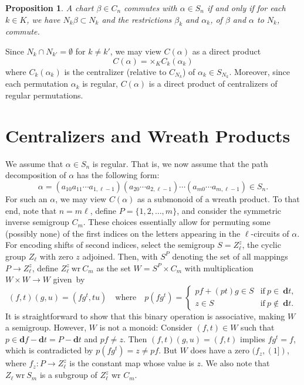 \documentclass{surv-l}
\numberwithin{equation}{section}
\numberwithin{table}{section}
\numberwithin{figure}{section}
\theoremstyle{plain}
\newtheorem{proposition}[equation]{Proposition}
\theoremstyle{definition}
\begin{document}
\begin{proposition}\label{prop4.13.2}
A chart $\beta\in C_{n}$ commutes with $\alpha\in S_{n}$ if and
only if for each $k\in K$, we have $N_{k}\beta\subset N_{k}$ and
the restrictions $\beta_{k}$ and $\alpha_{k}$, of $\beta$  and
$\alpha$ to $N_{k}$, commute.
\end{proposition}

Since $N_{k}\cap N_{k'}=\emptyset$ for $k\neq k'$, we may view
$C(\alpha)$ as a direct product
\[
C(\alpha)=\times {}_{K}C_{k}(\alpha_{k})
\]
where $C_{k}(\alpha_{k})$ is the centralizer (relative to
$C_{N_{k}}$) of $\alpha_{k}\in S_{N_{k}}$. Moreover, since each
permutation $\alpha_{k}$ is regular, $C(\alpha)$ is a direct
product of centralizers of regular permutations.

\section{Centralizers and Wreath Products}\label{sec4.14}

We assume that $\alpha\in S_{n}$ is regular. That is, we now
assume that the path decomposition of $\alpha$ has the
following form:
\[
\alpha=(a_{10}a_{11}\cdots a_{1,\ell-1})(a_{20}\cdots a_{2,\ell-1})
\cdots(a_{m0}\cdots a_{m,\ell-1})\in S_{n}.
\]
For such an $\alpha$, we may view $C(\alpha)$ as a submonoid of a
wreath product. To that end, note that $n =m\ell$, define
$P=\{1,2,\ldots,m\}$, and consider the symmetric inverse semigroup
$C_{m}$. These choices essentially allow for permuting some
(possibly none) of the first indices on the letters appearing in
the $\ell$-circuits of $\alpha$. For encoding shifts of second
indices, select the semigroup $S =Z_{\ell}^{z}$, the cyclic group
$Z_{\ell}$ with zero $z$ adjoined. Then, with $S^{P}$ denoting the
set of all mappings $P\rightarrow Z_{\ell}^{z}$, define
$Z_{\ell}^{z}\  \mathrm{wr} \ C_{m}$ as the set $W=S^{P}\times
C_{m}$ with multiplication $W\times W\rightarrow W$ given~by
\[
(f,t)(g,u) =(fg^{t},tu)\quad \mathrm{where}\quad
p(fg^{t})=\begin{cases}
pf+(pt)g\in S &\mathrm{if}\ p\in\ \mathbf{d}t,\\
z\in S &\mathrm{if}\ p\not\in\ \mathbf{d}t.
\end{cases}
\]
It is straightforward to show that this binary operation is
associative, making $W$ a semigroup. However, $W$ is not a monoid:
Consider $(f,t)\in W$ such that $p\in \mathbf{d}f- \textbf{d}t =
P-\textbf{d}t$ and $pf\neq z$. Then $(f,t)(g,u)=(f,t)$ implies
$fg^{t}=f$, which is contradicted by $p(fg^{t})=z\neq pf$. But $W$
does have a zero $(f_{z},(1])$, where $f_{z} : P\rightarrow
Z_{\ell}^{z}$ is the constant map whose value is $z$. We also note
that $Z_{\ell}\  \mathrm{wr} \ S_{m}$ is a subgroup of
$Z_{\ell}^{z}$ wr $C_{m}$.
\end{document}
